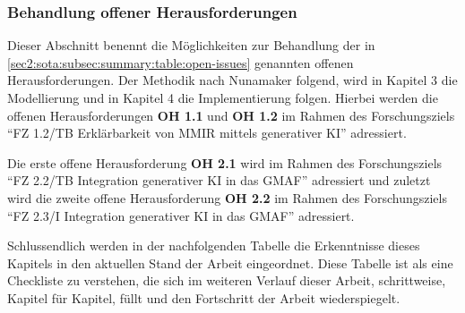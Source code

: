 \subsubsection{Behandlung offener Herausforderungen}
\label{sec2:sota:subsubsec:summary-handling-open-challenges}
Dieser Abschnitt benennt die Möglichkeiten zur Behandlung der in \cref{sec2:sota:subsec:summary:table:open-issues} genannten offenen Herausforderungen.
Der Methodik nach Nunamaker folgend, wird in Kapitel 3 die Modellierung und in Kapitel 4 die Implementierung folgen.
Hierbei werden die offenen Herausforderungen \textbf{OH 1.1} und \textbf{OH 1.2} im Rahmen des Forschungsziels \enquote{FZ 1.2/TB Erklärbarkeit von MMIR mittels generativer KI} adressiert.

Die erste offene Herausforderung \textbf{OH 2.1} wird im Rahmen des Forschungsziels \enquote{FZ 2.2/TB Integration generativer KI in das GMAF} adressiert und zuletzt wird die zweite offene Herausforderung \textbf{OH 2.2} im Rahmen des Forschungsziels \enquote{FZ 2.3/I Integration generativer KI in das GMAF} adressiert.

Schlussendlich werden in der nachfolgenden Tabelle die Erkenntnisse dieses Kapitels in den aktuellen Stand der Arbeit eingeordnet.
Diese Tabelle ist als eine Checkliste zu verstehen, die sich im weiteren Verlauf dieser Arbeit, schrittweise, Kapitel für Kapitel, füllt und den Fortschritt der Arbeit wiederspiegelt.



